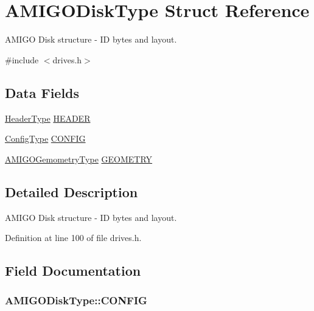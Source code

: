\hypertarget{structAMIGODiskType}{}\section{A\+M\+I\+G\+O\+Disk\+Type Struct Reference}
\label{structAMIGODiskType}


A\+M\+I\+GO Disk structure -\/ ID bytes and layout.  




{\ttfamily \#include $<$drives.\+h$>$}

\subsection*{Data Fields}
\begin{DoxyCompactItemize}
\item 
\hyperlink{structHeaderType}{Header\+Type} \hyperlink{structAMIGODiskType_a9814efe6f564b104fc7e0100231908a8}{H\+E\+A\+D\+ER}
\item 
\hyperlink{structConfigType}{Config\+Type} \hyperlink{structAMIGODiskType_aae94c3403ceb917006591e7bd4109207}{C\+O\+N\+F\+IG}
\item 
\hyperlink{structAMIGOGemometryType}{A\+M\+I\+G\+O\+Gemometry\+Type} \hyperlink{structAMIGODiskType_aa75cfbfabf8081ff7bca08cf87af4da8}{G\+E\+O\+M\+E\+T\+RY}
\end{DoxyCompactItemize}


\subsection{Detailed Description}
A\+M\+I\+GO Disk structure -\/ ID bytes and layout. 

Definition at line 100 of file drives.\+h.



\subsection{Field Documentation}
\subsubsection[{\texorpdfstring{C\+O\+N\+F\+IG}{CONFIG}}]{ A\+M\+I\+G\+O\+Disk\+Type\+::\+C\+O\+N\+F\+IG}\hypertarget{structAMIGODiskType_aae94c3403ceb917006591e7bd4109207}{}\label{structAMIGODiskType_aae94c3403ceb917006591e7bd4109207}


